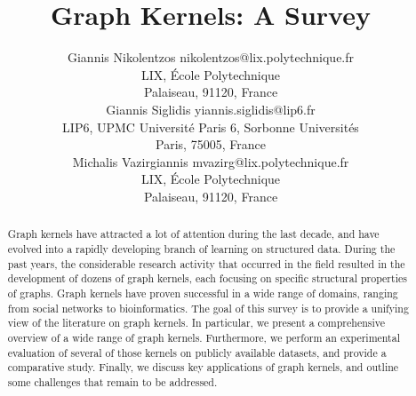 \documentclass[twoside,11pt]{article}
\begin{document}
\title{Graph Kernels: A Survey}

\author{\name Giannis Nikolentzos \email nikolentzos@lix.polytechnique.fr \\
		\addr LIX, \'Ecole Polytechnique\\
       	Palaiseau, 91120, France\\
       \name Giannis Siglidis \email yiannis.siglidis@lip6.fr \\
       \addr LIP6, UPMC Universit\'e Paris 6, Sorbonne Universit\'es\\
       Paris, 75005, France\\
       \name Michalis Vazirgiannis \email mvazirg@lix.polytechnique.fr \\
       \addr LIX, \'Ecole Polytechnique\\
       Palaiseau, 91120, France}



\maketitle


\begin{abstract}
Graph kernels have attracted a lot of attention during the last decade, and have evolved into a rapidly developing branch of learning on structured data.
During the past  years, the considerable research activity that occurred in the field resulted in the development of dozens of graph kernels, each focusing on specific structural properties of graphs.
Graph kernels have proven successful in a wide range of domains, ranging from social networks to bioinformatics.
The goal of this survey is to provide a unifying view of the literature on graph kernels.
In particular, we present a comprehensive overview of a wide range of graph kernels.
Furthermore, we perform an experimental evaluation of several of those kernels on publicly available datasets, and provide a comparative study.
Finally, we discuss key applications of graph kernels, and outline some challenges that remain to be addressed. 
\end{abstract}
\end{document}
